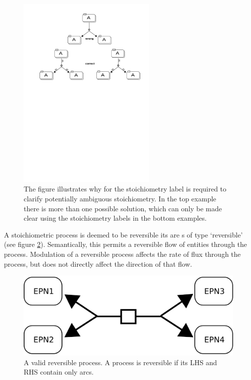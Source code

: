 \begin{figure}[htb]
  \centering
  \includegraphics[width=0.6\textwidth]{examples/stoichEx1}
  \caption{The figure illustrates why for the stoichiometry label is
    required to clarify potentially ambiguous stoichiometry. In the
    top example there is more than one possible solution, which can
    only be made clear using the stoichiometry labels in the bottom examples.}
  \label{fig:techref:prod-card}
\end{figure}



\label{sec:techref: semantics reversible procs}

A stoichiometric process is deemed to be reversible its
 are s of type `reversible' (see
figure \ref{fig:techref:process-reversibility}).  Semantically, this permits a
reversible flow of entities through the process.  Modulation of a
reversible process affects the rate of flux through the process, but
does not directly affect the direction of that flow.

\begin{figure}[htb]
  \centering
  \includegraphics[scale = 0.4]{images/reversible_process}
  \caption{A valid reversible process. A process is reversible if its LHS and RHS contain only  arcs.}
  \label{fig:techref:process-reversibility}
\end{figure}

